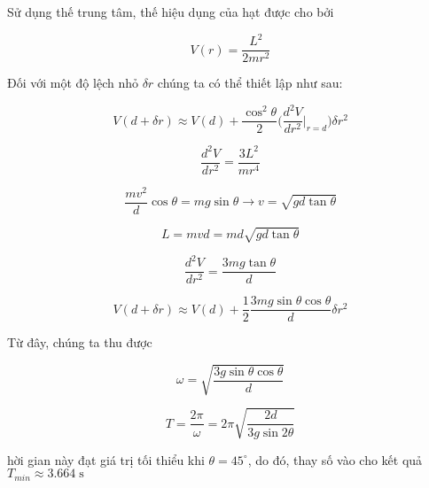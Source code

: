 \begin{solution}
Sử dụng thế trung tâm, thế hiệu dụng của hạt được cho bởi

$$V(r) = \frac{L^2}{2mr^2}$$

Đối với một độ lệch nhỏ $\delta r$ chúng ta có thể thiết lập như sau:

$$V(d + \delta r) \approx V(d) + \frac{\cos^2\theta}{2}\bigg(\frac{d^2V}{dr^2}\bigg|_{r=d}\bigg)\delta r^2$$

$$\frac{d^2V}{dr^2} = \frac{3L^2}{mr^4}$$

$$\frac{mv^2}{d}\cos\theta = mg\sin\theta\longrightarrow v = \sqrt{gd\tan\theta}$$

$$L = mvd = md\sqrt{gd\tan\theta}$$

$$\frac{d^2V}{dr^2} = \frac{3mg\tan\theta}{d}$$

$$V(d+\delta r) \approx V(d) + \frac{1}{2}\frac{3mg\sin\theta\cos\theta}{d}\delta r^2$$

Từ đây, chúng ta thu được

$$\omega = \sqrt{\frac{3g\sin\theta\cos\theta}{d}}$$

$$T = \frac{2\pi}{\omega} = 2\pi\sqrt{\frac{2d}{3g\sin2\theta}}$$

hời gian này đạt giá trị tối thiểu khi $\theta = 45^{\circ}$, do đó, thay số vào cho kết quả $T_{min} \approx \boxed{3.664\;\mathrm{s}}$

\end{solution}